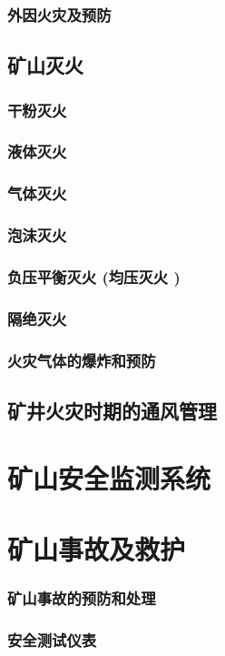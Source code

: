 \documentclass[UTF8]{../../ApplicationUniverse}
\begin{document}
        \subsubsection{外因火灾及预防}
    \subsection{矿山灭火}
        \subsubsection{干粉灭火}
        \subsubsection{液体灭火}
        \subsubsection{气体灭火}
        \subsubsection{泡沫灭火}
        \subsubsection{负压平衡灭火 (均压灭火 )}
        \subsubsection{隔绝灭火}
        \subsubsection{火灾气体的爆炸和预防}
    \subsection{矿井火灾时期的通风管理}
\section{矿山安全监测系统}
\section{矿山事故及救护}
    \subsubsection{矿山事故的预防和处理}
    \subsubsection{安全测试仪表}
\end{document}
